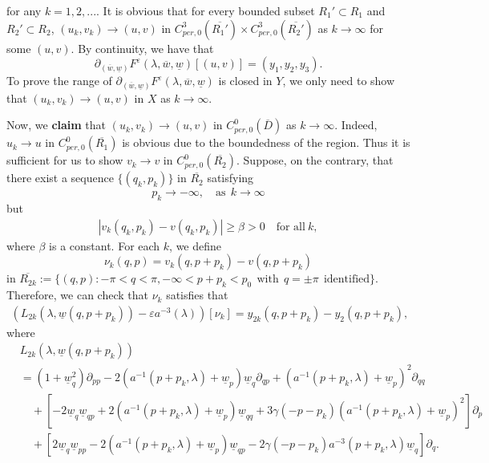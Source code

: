\documentclass[11pt,reqno]{amsart}
\numberwithin{equation}{section}
\theoremstyle{definition}
\theoremstyle{remark}
\begin{document}
for any $k=1,2,...$. It is obvious that for every bounded subset
$R_1'\subset R_1$ and $R_2'\subset R_2$, $(u_k,v_k)\rightarrow(u,v)$
in $C^{3}_{per,0}(\overline{R_1'})\times
C^{3}_{per,0}(\overline{R_2'})$ as $k\rightarrow\infty$ for some
$(u,v)$. By continuity, we have that
$$
\partial_{(\overline{w},\underline{w})}F^{\varepsilon}(\lambda, \overline{w},\underline{w})[(u,v)]=(y_1,y_2,y_3).
$$
To prove the range of
$\partial_{(\overline{w},\underline{w})}F^{\varepsilon}(\lambda,
\overline{w},\underline{w})$ is closed in $Y$, we only need to show
that $(u_k,v_k)\rightarrow(u,v)$ in $X$ as $k\rightarrow\infty$.

Now, we {\bf claim} that $(u_k,v_k)\rightarrow(u,v)$ in
$C^{0}_{per,0}(\overline{D})$
as $k\rightarrow\infty$. Indeed, $u_k\rightarrow u$ in
$C^{0}_{per,0}(\overline{R_1})$ is obvious due to the boundedness of
the region. Thus it is sufficient for us to show $v_k\rightarrow v$
in $C^{0}_{per,0}(\overline{R_2})$. Suppose, on the contrary, that
there exist a sequence $\{(q_k, p_k)\}$ in $\overline{R_2}$
satisfying
$$
p_k\rightarrow -\infty, \quad \text{as} ~~k\rightarrow\infty
$$
but
\begin{eqnarray}
|v_{k}(q_k,p_k)-v(q_k,p_k)|\geq \beta>0\quad \text{for~all}~k,
\label{eq4.11}
\end{eqnarray}
where $\beta$ is a constant. For each $k$, we define
$$
\nu_k(q,p)=v_k(q,p+p_k)-v(q,p+p_k)
$$
in $\overline{R_{2k}}:=\{(q,p):-\pi<q<\pi, -\infty<p+p_k<p_0~~
\text{with}~~ q=\pm \pi~~ \text{identified}\}$. Therefore, we can
check that $\nu_k$ satisfies that
\begin{eqnarray}
(L_{2k}(\lambda,\underline{w}(q,p+p_k))-\varepsilon
a^{-3}(\lambda))[\nu_k]=y_{2k}(q,p+p_k)-y_{2}(q,p+p_k),
\label{eq4.12}
\end{eqnarray}
where
\begin{equation}
\begin{split}
&L_{2k}(\lambda,\underline{w}(q,p+p_k))\\
&=\left(1+\underline{w}_q^2\right)\partial_{pp}-2\left(a^{-1}(p+p_k,\lambda)+\underline{w}_p\right)
\underline{w}_q\partial_{qp}+\left(a^{-1}(p+p_k,\lambda)+\underline{w}_p\right)^2\partial_{qq} \nonumber\\
&\quad+\left[-2\underline{w}_q\underline{w}_{qp}+2\left(a^{-1}(p+p_k,\lambda)+\underline{w}_p\right)\underline{w}_{qq}
+3\gamma(-p-p_k)\left(a^{-1}(p+p_k,\lambda)+\underline{w}_p\right)^2\right]\partial_p \nonumber\\
&\quad+
\left[2\underline{w}_q\underline{w}_{pp}-2\left(a^{-1}(p+p_k,\lambda)+\underline{w}_p\right)\underline{w}_{qp}
-2\gamma(-p-p_k)a^{-3}(p+p_k,\lambda)\underline{w}_q\right]\partial_q. \nonumber
\end{split}
\end{equation}
\end{document}
